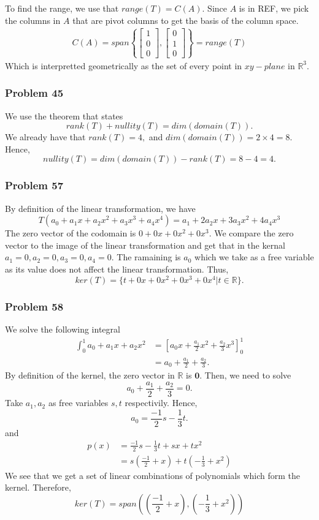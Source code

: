 \documentclass[a4paper,12pt]{article}
\begin{document}
To find the range, we use that $range(T)=C(A).$ Since $A$ is in REF, we pick the columns in $A$ that are pivot columns to get the basis of the column space. 
\begin{align*}
    C(A)= span\left\{
        \begin{bmatrix}
            1\\
            0\\
            0
        \end{bmatrix},\begin{bmatrix}
            0\\
            1\\
            0
        \end{bmatrix}
    \right\} =range(T)
\end{align*}
Which is interpretted geometrically as the set of every point in $xy-plane$ in $\mathbb{R}^3.$
\subsubsection*{Problem 45}
We use the theorem that states
\[rank(T)+nullity(T)=dim(domain(T)).\]
We already have that $rank(T)=4,$ and $dim(domain(T))=2 \times 4=8.$ Hence, \[nullity(T)=dim(domain(T))-rank(T)=8-4=4.\]
\subsubsection*{Problem 57} By definition of the linear transformation, we have \[T(a_0+a_1x+a_2x^2+a_3x^3+a_4x^4)=a_1+2a_2x+3a_3x^2+4a_4x^3\]
The zero vector of the codomain is $0+0x+0x^2+0x^3$. We compare the zero vector to the image of the linear transformation and get that in the kernal $a_1=0, a_2=0, a_3=0, a_4=0.$
The ramaining is $a_0$ which we take as a free variable as its value does not affect the linear transformation. Thus, 
\[ker(T)=\{t+0x+0x^2+0x^3+0x^4| t \in \mathbb{R}\}.\]
\subsubsection*{Problem 58}
We solve the following integral
\begin{align*}
    \int_{0}^{1}{a_0+a_1x+a_2x^2}&= \left[a_0x+\frac{a_1}{2}x^2+\frac{a_2}{3}x^3 \right]_{0}^{1}\\
                                 &=a_0+\frac{a_1}{2}+\frac{a_2}{3}.
\end{align*}
By definition of the kernel, the zero vector in $\mathbb{R}$ is $\textbf{0}.$ Then, we need to solve \[a_0+\frac{a_1}{2}+\frac{a_2}{3}=0.\]
Take $a_1, a_2$ as free variables $s,t$ respectivily. Hence, \[a_0=\frac{-1}{2}s-\frac{1}{3}t.\] and 
\begin{align*}
p(x)&=\frac{-1}{2}s-\frac{1}{3}t+sx+tx^2\\
    &=s(\frac{-1}{2}+x)+t(-\frac{1}{3}+x^2)
\end{align*}
We see that we get a set of linear combinations of polynomials which form the kernel. Therefore,
\[ker(T)=span((\frac{-1}{2}+x),(-\frac{1}{3}+x^2))\]
\end{document}

